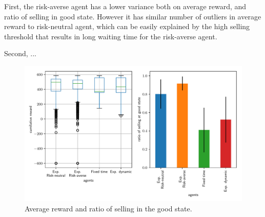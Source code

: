 First, the risk-averse agent has a lower variance both on average reward, and ratio of selling in good state. However it has similar number of outliers in average reward to risk-neutral agent, which can be easily explained by the high selling threshold that results in long waiting time for the risk-averse agent.

Second, ...

\begin{figure}[h]
    \centering
    \includegraphics[width=0.99\linewidth]{img/performance.pdf}
    \caption{Average reward and ratio of selling in the good state.}\label{fig:perf}
\end{figure}
